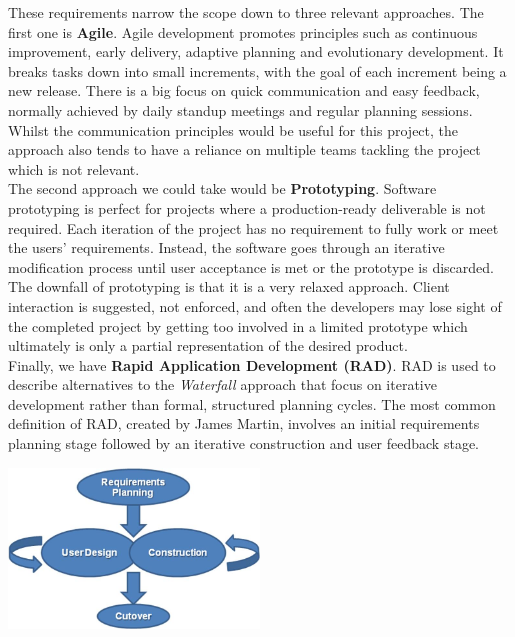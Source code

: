 These requirements narrow the scope down to three relevant approaches.  The first one is \textbf{Agile}.  Agile development promotes principles such as continuous improvement, early delivery, adaptive planning and evolutionary development. It breaks tasks down into small increments, with the goal of each increment being a new release. There is a big focus on quick communication and easy feedback, normally achieved by daily standup meetings and regular planning sessions. Whilst the communication principles would be useful for this project, the approach also tends to have a reliance on multiple teams tackling the project which is not relevant.\\
The second approach we could take would be \textbf{Prototyping}.  Software prototyping is perfect for projects where a production-ready deliverable is not required. Each iteration of the project has no requirement to fully work or meet the users' requirements. Instead, the software goes through an iterative modification process until user acceptance is met or the prototype is discarded.  The downfall of prototyping is that it is a very relaxed approach. Client interaction is suggested, not enforced, and often the developers may lose sight of the completed project by getting too involved in a limited prototype which ultimately is only a partial representation of the desired product.\\
Finally, we have \textbf{Rapid Application Development (RAD)}.  RAD is used to describe alternatives to the \emph{Waterfall} approach that focus on iterative development rather than formal, structured planning cycles. The most common definition of RAD, created by James Martin, involves an initial requirements planning stage followed by an iterative construction and user feedback stage.\\

    \begin{minipage}{\linewidth}
      \centering
      \includegraphics[width=0.5\textwidth]{./img/rad-model.jpg}
    \end{minipage}\\

